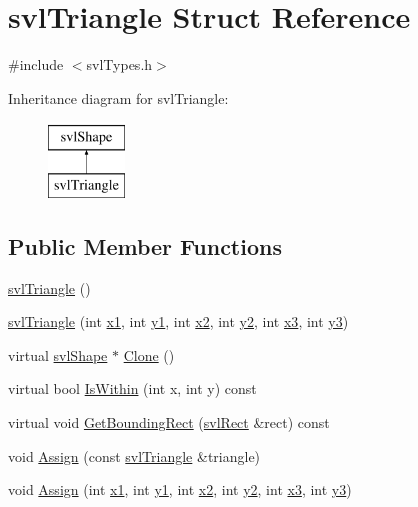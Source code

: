 \hypertarget{structsvl_triangle}{\section{svl\-Triangle Struct Reference}
\label{structsvl_triangle}
}


{\ttfamily \#include $<$svl\-Types.\-h$>$}

Inheritance diagram for svl\-Triangle\-:\begin{figure}[H]
\begin{center}
\leavevmode
\includegraphics[height=2.000000cm]{d9/d37/structsvl_triangle}
\end{center}
\end{figure}
\subsection*{Public Member Functions}
\begin{DoxyCompactItemize}
\item 
\hyperlink{structsvl_triangle_a972f66b1feca53a63b56d1a3abb8d489}{svl\-Triangle} ()
\item 
\hyperlink{structsvl_triangle_a0457b9deae5506333a0a25cb1a637bb8}{svl\-Triangle} (int \hyperlink{structsvl_triangle_aadd880d75747824dc68592b008cc622f}{x1}, int \hyperlink{structsvl_triangle_a8d2d2e3a7518fbe2dd54ae83295a5564}{y1}, int \hyperlink{structsvl_triangle_a0d54bb4e6b2a9a776c7934f98ab615f2}{x2}, int \hyperlink{structsvl_triangle_a5b846c983e7fb8778b41310ecccb31d6}{y2}, int \hyperlink{structsvl_triangle_a55e31484afa1dd95b65fed71acd32798}{x3}, int \hyperlink{structsvl_triangle_ac077e0223f63837cc3d6013935141db6}{y3})
\item 
virtual \hyperlink{structsvl_shape}{svl\-Shape} $\ast$ \hyperlink{structsvl_triangle_a9496d2664a725963ae1ffb9224608f1f}{Clone} ()
\item 
virtual bool \hyperlink{structsvl_triangle_a8b3889641a78d62ae2f783d104896fff}{Is\-Within} (int x, int y) const 
\item 
virtual void \hyperlink{structsvl_triangle_a9c0deece2817c6249bf1959e0571956f}{Get\-Bounding\-Rect} (\hyperlink{structsvl_rect}{svl\-Rect} \&rect) const 
\item 
void \hyperlink{structsvl_triangle_a99d9927c203f27da699fe9aaa85f656e}{Assign} (const \hyperlink{structsvl_triangle}{svl\-Triangle} \&triangle)
\item 
void \hyperlink{structsvl_triangle_a049f52af5212130ef47e61851a4cb901}{Assign} (int \hyperlink{structsvl_triangle_aadd880d75747824dc68592b008cc622f}{x1}, int \hyperlink{structsvl_triangle_a8d2d2e3a7518fbe2dd54ae83295a5564}{y1}, int \hyperlink{structsvl_triangle_a0d54bb4e6b2a9a776c7934f98ab615f2}{x2}, int \hyperlink{structsvl_triangle_a5b846c983e7fb8778b41310ecccb31d6}{y2}, int \hyperlink{structsvl_triangle_a55e31484afa1dd95b65fed71acd32798}{x3}, int \hyperlink{structsvl_triangle_ac077e0223f63837cc3d6013935141db6}{y3})
\end{DoxyCompactItemize}
